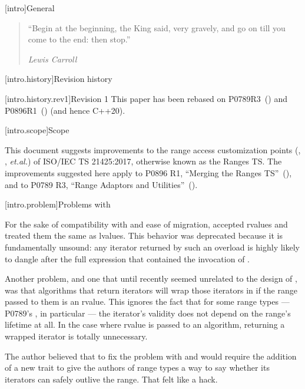 [intro]{General}

\begin{quote}
``Begin at the beginning, the King said, very gravely, and go on till you come to the end: then stop.''
\begin{flushright}
\textemdash \textit{Lewis Carroll}
\end{flushright}
\end{quote}

\begin{addedblock}
[intro.history]{Revision history}

[intro.history.rev1]{Revision 1}
This paper has been rebased on P0789R3~(\cite{P0789}) and P0896R1~(\cite{P0896})
(and hence C++20).
\end{addedblock}

[intro.scope]{Scope}

\pnum
This document suggests improvements to the range access customization points
(, , \textit{et.al.}) of ISO/IEC TS 21425:2017, otherwise
known as the Ranges TS. The improvements suggested here apply to P0896 R1,
``Merging the Ranges TS''~(\cite{P0896}), and to P0789 R3, ``Range Adaptors and
Utilities''~(\cite{P0789}).

[intro.problem]{Problems with }

\pnum
For the sake of compatibility with  and ease of migration,
 accepted rvalues and treated them the
same as  lvalues. This behavior was deprecated because it is
fundamentally unsound: any iterator returned by such an overload is highly
likely to dangle after the full expression that contained the invocation of
.

\pnum
Another problem, and one that until recently seemed unrelated to the design of
, was that algorithms that return iterators will wrap those
iterators in  if the range passed
to them is an rvalue. This ignores the fact that for some range types ---
 P0789's ,
in particular --- the iterator's validity does not
depend on the range's lifetime at all. In the case where rvalue
 is passed to an algorithm,
returning a wrapped iterator is totally unnecessary.

\pnum
The author believed that to fix the problem with  and
 would require the addition of a new trait to give the authors
of range types a way to say whether its iterators can safely outlive the range.
That felt like a hack.


